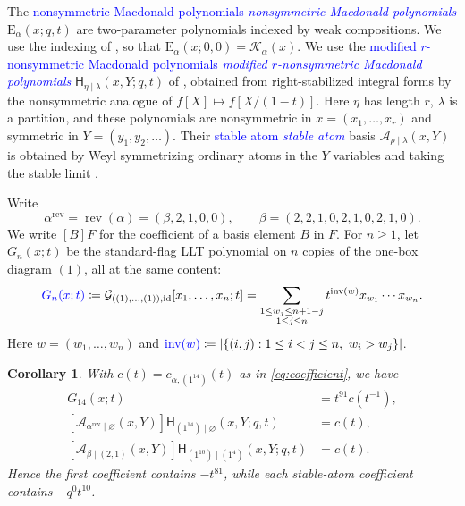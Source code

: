 \documentclass[10pt,reqno]{amsart}
\newtheorem{corollary}[theorem]{Corollary}
\newcommand{\keyK}{\mathcal{K}}
\newcommand{\atomA}{\mathcal{A}}
\newcommand{\flagLLT}{\mathcal{G}}
\newcommand{\macH}{\mathsf{H}}
\newcommand{\macdonaldE}{\mathrm{E}}
\newcommand{\defin}[1]{%
  \relax\ifmmode\textcolor{blue}{#1}%
  \else\textcolor{blue}{\emph{#1}}\fi}
\begin{document}
The \defin{nonsymmetric Macdonald polynomials}
$\macdonaldE_\alpha(x;q,t)$ are two-parameter polynomials indexed by weak
compositions.  We use the indexing of \cite{HaglundHaimanLoehr2008}, so that
$\macdonaldE_\alpha(x;0,0)=\keyK_\alpha(x)$.
We use the \defin{modified $r$-nonsymmetric Macdonald polynomials}
$\macH_{\eta\mid\lambda}(x,Y;q,t)$ of
\cite[Definition~7.6.5]{BlasiakHaimanMorsePunSeelinger2025x}, obtained from
right-stabilized integral forms by the nonsymmetric analogue of
$f[X]\mapsto f[X/(1-t)]$.  Here $\eta$ has length $r$, $\lambda$ is a
partition, and these polynomials are nonsymmetric in $x=(x_1,\dotsc,x_r)$
and symmetric in $Y=(y_1,y_2,\dotsc)$.  Their \defin{stable atom}
basis $\atomA_{\rho\mid\lambda}(x,Y)$ is obtained by Weyl symmetrizing
ordinary atoms in the $Y$ variables and taking the stable limit
\cite[Section~7.7]{BlasiakHaimanMorsePunSeelinger2025x}.

Write
\[
 \alpha^{\mathrm{rev}}=\operatorname{rev}(\alpha)
       =(\beta,2,1,0,0),\qquad
 \beta=(2,2,1,0,2,1,0,2,1,0).
\]
We write $[B]F$ for the coefficient of a basis element $B$ in $F$.
For $n\geq1$, let $G_n(x;t)$ be the standard-flag LLT polynomial on $n$
copies of the one-box diagram $(1)$, all at the same content:
\[
 \defin{G_n(x;t)}\coloneqq
 \flagLLT_{((1),\dotsc,(1)),\mathrm{id}}[x_1,\dotsc,x_n;t]
 =\sum_{\substack{1\leq w_j\leq n+1-j\\1\leq j\leq n}}
 t^{\operatorname{inv}(w)}x_{w_1}\dotsm x_{w_n}.
\]
Here $w=(w_1,\dotsc,w_n)$ and
$\defin{\operatorname{inv}(w)}\coloneqq
|\{(i,j):1\leq i<j\leq n,\ w_i>w_j\}|$.

\begin{corollary}\label{cor:consequences}
With $c(t)=c_{\alpha,(1^{14})}(t)$ as in \eqref{eq:coefficient}, we have
\begin{align}
 [\atomA_{\alpha^{\mathrm{rev}}}(x)]G_{14}(x;t)
   &=t^{91}c(t^{-1}),\label{eq:flaggedCounterexample}\\
 [\atomA_{\alpha^{\mathrm{rev}}\mid\varnothing}(x,Y)]
 \macH_{(1^{14})\mid\varnothing}(x,Y;q,t)
   &=c(t),\label{eq:stableCounterexample}\\
 [\atomA_{\beta\mid(2,1)}(x,Y)]
 \macH_{(1^{10})\mid(1^4)}(x,Y;q,t)
   &=c(t).\label{eq:partialCounterexample}
\end{align}
Hence the first coefficient contains $-t^{81}$, while each stable-atom
coefficient contains $-q^0t^{10}$.
\end{corollary}
\end{document}

